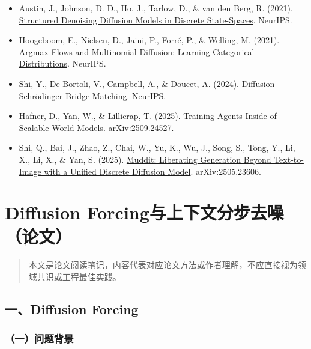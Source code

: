 \begin{itemize}
\tightlist
\item
  Austin, J., Johnson, D. D., Ho, J., Tarlow, D., \& van den Berg, R. (2021). \href{https://arxiv.org/abs/2107.03006}{Structured Denoising Diffusion Models in Discrete State-Spaces}. NeurIPS.
\item
  Hoogeboom, E., Nielsen, D., Jaini, P., Forré, P., \& Welling, M. (2021). \href{https://arxiv.org/abs/2102.05379}{Argmax Flows and Multinomial Diffusion: Learning Categorical Distributions}. NeurIPS.
\item
  Shi, Y., De Bortoli, V., Campbell, A., \& Doucet, A. (2024). \href{https://arxiv.org/abs/2303.16852}{Diffusion Schrödinger Bridge Matching}. NeurIPS.
\item
  Hafner, D., Yan, W., \& Lillicrap, T. (2025). \href{https://arxiv.org/abs/2509.24527}{Training Agents Inside of Scalable World Models}. arXiv:2509.24527.
\item
  Shi, Q., Bai, J., Zhao, Z., Chai, W., Yu, K., Wu, J., Song, S., Tong, Y., Li, X., Li, X., \& Yan, S. (2025). \href{https://arxiv.org/abs/2505.23606}{Muddit: Liberating Generation Beyond Text-to-Image with a Unified Discrete Diffusion Model}. arXiv:2505.23606.
\end{itemize}

\clearpage

\hypertarget{diffusion-forcingux4e0eux4e0aux4e0bux6587ux5206ux6b65ux53bbux566aux8bbaux6587}{%
\section{Diffusion Forcing与上下文分步去噪（论文）}\label{diffusion-forcingux4e0eux4e0aux4e0bux6587ux5206ux6b65ux53bbux566aux8bbaux6587}}

\begin{quote}
本文是论文阅读笔记，内容代表对应论文方法或作者理解，不应直接视为领域共识或工程最佳实践。
\end{quote}

\hypertarget{ux4e00diffusion-forcing}{%
\subsection{一、Diffusion Forcing}\label{ux4e00diffusion-forcing}}

\hypertarget{ux4e00ux95eeux9898ux80ccux666f-7}{%
\subsubsection{（一）问题背景}\label{ux4e00ux95eeux9898ux80ccux666f-7}}

